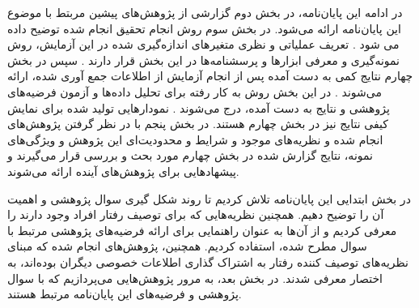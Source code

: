در ادامه این پایان‌نامه، در بخش دوم گزارشی از پژوهش‌های پیشین مربتط با موضوع این پایان‌نامه ارائه می‌شود.
در بخش سوم روش انجام تحقیق انجام شده توضیح داده می شود
\!.
تعریف عملیاتی و نظری متغیر‌های اندازه‌گیری شده در این آزمایش، روش نمونه‌گیری و معرفی ابزارها و پرسشنامه‌ها در این بخش قرار دارند
\!.
سپس در بخش چهارم نتایج کمی به دست آمده پس از انجام آزمایش از اطلاعات جمع آوری شده، ارائه می‌شوند
\!.
در این بخش  روش به کار رفته برای تحلیل داده‌ها و آزمون فرضیه‌های پژوهشی و نتایج  به دست آمده، درج  می‌شوند
\!.
نمودار‌هایی تولید شده برای نمایش کیفی نتایج نیز در بخش چهارم هستند.
در بخش پنجم با در نظر گرفتن پژوهش‌های انجام شده و نظریه‌های موجود و شرایط و محدودیت‌ای این پژوهش و ویژگی‌های نمونه، نتایج گزارش شده در بخش چهارم مورد بحث و بررسی
قرار می‌گیرند و پیشهادهایی برای پژوهش‌های آینده ارائه می‌شوند.

در بخش ابتدایی این پایان‌نامه تلاش کردیم تا روند شکل گیری سوال پژوهشی و اهمیت آن را توضیح دهیم.
همچنین نظریه‌هایی که برای توصیف رفتار افراد وجود دارند را معرفی کردیم و از آن‌ها به عنوان راهنمایی 
برای ارائه فرضیه‌های پژوهشی مرتبط با سوال‌ مطرح شده، استفاده کردیم. 
همچنین، پژوهش‌های انجام شده که مبنای نظریه‌های توصیف کننده رفتار به اشتراک گذاری اطلاعات خصوصی دیگران
بوده‌اند، به اختصار معرفی شدند. در بخش بعد، به مرور پژوهش‌هایی می‌پردازیم که با سوال پژوهشی و فرضیه‌های این پایان‌نامه مرتبط هستند.



